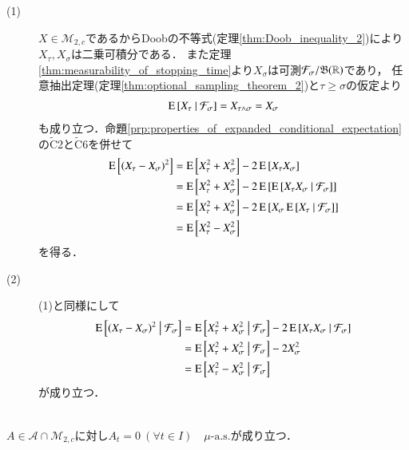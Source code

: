 	\begin{prf}\mbox{}
	\begin{description}
		\item[(1)] 
			$X \in \mathcal{M}_{2,c}$であるからDoobの不等式(定理\ref{thm:Doob_inequality_2})により$X_\tau,X_\sigma$は二乗可積分である．
			また定理\ref{thm:measurability_of_stopping_time}より$X_\sigma$は可測$\mathcal{F}_\sigma/\mathfrak{B}(\mathbb{R})$であり，
			任意抽出定理(定理\ref{thm:optional_sampling_theorem_2})と$\tau \geq \sigma$の仮定より
			\begin{align}
				\operatorname{E} \left[ X_{\tau} \ \middle|\ \mathcal{F}_\sigma \right] = X_{\tau \wedge \sigma} = X_\sigma
			\end{align}
			も成り立つ．命題\ref{prp:properties_of_expanded_conditional_expectation}の$\tilde{\mathrm{C}}$2と$\tilde{\mathrm{C}}$6を併せて
			\begin{align}
				\operatorname{E} \left[ (X_{\tau} - X_{\sigma})^2 \right]
				&= \operatorname{E} \left[ X_{\tau}^2 + X_{\sigma}^2 \right] - 2\operatorname{E} \left[ X_{\tau}X_{\sigma} \right] \\
				&= \operatorname{E} \left[ X_{\tau}^2 + X_{\sigma}^2 \right] - 2\operatorname{E} \left[ \operatorname{E} \left[ X_{\tau}X_{\sigma} \ \middle|\ \mathcal{F}_\sigma \right] \right] \\
				&= \operatorname{E} \left[ X_{\tau}^2 + X_{\sigma}^2 \right] - 2\operatorname{E} \left[ X_{\sigma}\operatorname{E} \left[ X_{\tau} \ \middle|\ \mathcal{F}_\sigma \right] \right] \\
				&= \operatorname{E} \left[ X_{\tau}^2 - X_{\sigma}^2 \right]
			\end{align}
			を得る．
			
		\item[(2)]
			(1)と同様にして
			\begin{align}
				\operatorname{E} \left[ (X_{\tau} - X_{\sigma})^2 \ \middle|\ \mathcal{F}_\sigma \right]
				&= \operatorname{E} \left[ X_{\tau}^2 + X_{\sigma}^2 \ \middle|\ \mathcal{F}_\sigma \right] - 2\operatorname{E} \left[ X_{\tau}X_{\sigma} \ \middle|\ \mathcal{F}_\sigma \right] \\
				&= \operatorname{E} \left[ X_{\tau}^2 + X_{\sigma}^2 \ \middle|\ \mathcal{F}_\sigma \right] - 2X_{\sigma}^2 \\
				&= \operatorname{E} \left[ X_{\tau}^2 - X_{\sigma}^2 \ \middle|\ \mathcal{F}_\sigma \right]
			\end{align}
			が成り立つ．
		\end{description}
		\QED
	\end{prf}
	
	\begin{screen}
		\begin{prp}[有界変動な連続二乗可積分マルチンゲールは0]\mbox{}\\
			$A \in \mathcal{A} \cap \mathcal{M}_{2,c}$に対し$A_t = 0\ (\forall t \in I)\quad \mbox{$\mu$-a.s.}$が成り立つ．
			\label{prp:bounded_continuous_M_2c_path}
		\end{prp}
	\end{screen}
	
